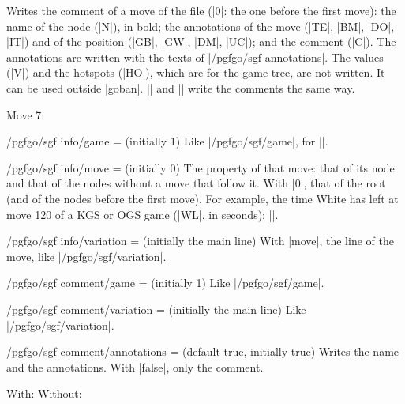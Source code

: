\begin{command}{\sgfcomment{}}
	Writes the comment of a move of the file (|0|: the one before the first move): the name of the node (|N|), in bold; the annotations of the move (|TE|, |BM|, |DO|, |IT|) and of the position (|GB|, |GW|, |DM|, |UC|); and the comment (|C|). The annotations are written with the texts of |/pgfgo/sgf annotations|. The values (|V|) and the hotspots (|HO|), which are for the game tree, are not written. It can be used outside |goban|. |\sgfanimation| and |\sgfdiagrams| write the comments the same way.

	\begin{codeexample}[]
		Move 7: 
	\end{codeexample}
\end{command}

\begin{key}{/pgfgo/sgf info/game =  (initially 1)}
	Like |/pgfgo/sgf/game|, for |\sgfinfo|.
\end{key}

\begin{key}{/pgfgo/sgf info/move =  (initially 0)}
	The property of that move: that of its node and that of the nodes without a move that follow it. With |0|, that of the root (and of the nodes before the first move). For example, the time White has left at move 120 of a KGS or OGS game (|WL|, in seconds): ||.
\end{key}

\begin{key}{/pgfgo/sgf info/variation =  (initially the main line)}
	With |move|, the line of the move, like |/pgfgo/sgf/variation|.
\end{key}

\begin{key}{/pgfgo/sgf comment/game =  (initially 1)}
	Like |/pgfgo/sgf/game|.
\end{key}

\begin{key}{/pgfgo/sgf comment/variation =  (initially the main line)}
	Like |/pgfgo/sgf/variation|.

	\begin{codeexample}[]
	\end{codeexample}
\end{key}

\begin{key}{/pgfgo/sgf comment/annotations =  (default true, initially true)}
	Writes the name and the annotations. With |false|, only the comment.

	\begin{codeexample}[]
		With: 
		\quad Without: 
	\end{codeexample}
\end{key}

